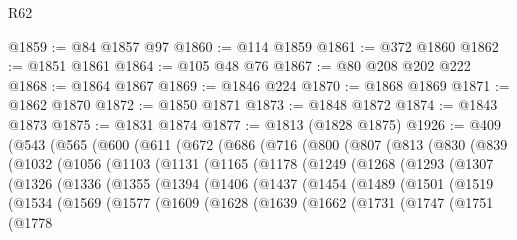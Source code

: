 \begin{lexlean}{R62}
\begin{coremodule}
@1859 := @84 @1857 @97
@1860 := @114 @1859
@1861 := @372 @1860
@1862 := @1851 @1861
@1864 := @105 @48 @76
@1867 := @80 @208 @202 @222
@1868 := @1864 @1867
@1869 := @1846 @224
@1870 := @1868 @1869
@1871 := @1862 @1870
@1872 := @1850 @1871
@1873 := @1848 @1872
@1874 := @1843 @1873
@1875 := @1831 @1874
@1877 := @1813 (@1828 @1875)
@1926 := @409
    (@543
      (@565
        (@600
          (@611
            (@672
              (@686
                (@716
                  (@800
                    (@807
                      (@813
                        (@830
                          (@839
                            (@1032
                              (@1056
                                (@1103
                                  (@1131
                                    (@1165
                                      (@1178
                                        (@1249
                                          (@1268
                                            (@1293
                                              (@1307
                                                (@1326
                                                  (@1336
                                                    (@1355
                                                      (@1394
                                                        (@1406
                                                          (@1437
                                                            (@1454
                                                              (@1489
                                                                (@1501
                                                                  (@1519
                                                                    (@1534
                                                                      (@1569
                                                                        (@1577
                                                                          (@1609
                                                                            (@1628
                                                                              (@1639
                                                                                (@1662
                                                                                  (@1731
                                                                                    (@1747
                                                                                      (@1751
                                                                                        (@1778

\end{coremodule}
\end{lexlean}
